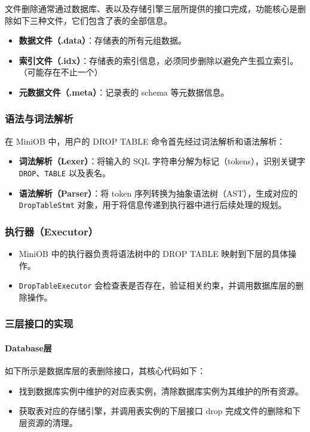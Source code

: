 \documentclass[a4paper, 12pt]{article}
\begin{document}
文件删除通常通过数据库、表以及存储引擎三层所提供的接口完成，功能核心是删除如下三种文件，它们包含了表的全部信息。
\begin{itemize}
    \item \textbf{数据文件（.data）}：存储表的所有元组数据。
    \item \textbf{索引文件（.idx）}：存储表的索引信息，必须同步删除以避免产生孤立索引。（可能存在不止一个）
    \item \textbf{元数据文件（.meta）}：记录表的 schema 等元数据信息。
\end{itemize}

\subsubsection{语法与词法解析}
在 MiniOB 中，用户的 DROP TABLE 命令首先经过词法解析和语法解析：
\begin{itemize}
    \item \textbf{词法解析（Lexer）}：将输入的 SQL 字符串分解为标记（tokens），识别关键字 \texttt{DROP}、\texttt{TABLE} 以及表名。
    \item \textbf{语法解析（Parser）}：将 token 序列转换为抽象语法树（AST），生成对应的 \texttt{DropTableStmt} 对象，用于将信息传递到执行器中进行后续处理的规划。
\end{itemize}

\subsubsection{执行器（Executor）}
\begin{itemize}
    \item MiniOB 中的执行器负责将语法树中的 DROP TABLE 映射到下层的具体操作。
    \item \texttt{DropTableExecutor} 会检查表是否存在，验证相关约束，并调用数据库层的删除操作。
\end{itemize}

\subsubsection{三层接口的实现}
\paragraph{Database层}
如下所示是数据库层的表删除接口，其核心代码如下：
\begin{itemize}
    \item 找到数据库实例中维护的对应表实例，清除数据库实例为其维护的所有资源。
    \item 获取表对应的存储引擎，并调用表实例的下层接口 drop 完成文件的删除和下层资源的清理。
\end{itemize}
\end{document}
